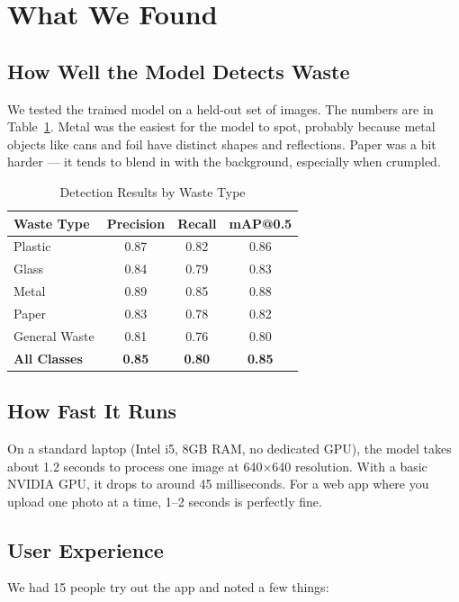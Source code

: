\documentclass[conference]{IEEEtran}
\begin{document}
\section{What We Found}

\subsection{How Well the Model Detects Waste}
We tested the trained model on a held-out set of images. The numbers are in Table~\ref{tab:results}. Metal was the easiest for the model to spot, probably because metal objects like cans and foil have distinct shapes and reflections. Paper was a bit harder — it tends to blend in with the background, especially when crumpled.

\begin{table}[H]
\centering
\caption{Detection Results by Waste Type}
\label{tab:results}
\begin{tabular}{@{}lccc@{}}
\toprule
\textbf{Waste Type} & \textbf{Precision} & \textbf{Recall} & \textbf{mAP@0.5} \\
\midrule
Plastic & 0.87 & 0.82 & 0.86 \\
Glass & 0.84 & 0.79 & 0.83 \\
Metal & 0.89 & 0.85 & 0.88 \\
Paper & 0.83 & 0.78 & 0.82 \\
General Waste & 0.81 & 0.76 & 0.80 \\
\midrule
\textbf{All Classes} & \textbf{0.85} & \textbf{0.80} & \textbf{0.85} \\
\bottomrule
\end{tabular}
\end{table}

\subsection{How Fast It Runs}
On a standard laptop (Intel i5, 8GB RAM, no dedicated GPU), the model takes about 1.2 seconds to process one image at 640×640 resolution. With a basic NVIDIA GPU, it drops to around 45 milliseconds. For a web app where you upload one photo at a time, 1–2 seconds is perfectly fine.

\subsection{User Experience}
We had 15 people try out the app and noted a few things:
\end{document}

